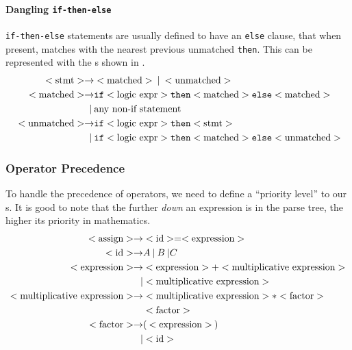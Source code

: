 \paragraph{Dangling \texttt{if-then-else}}\label{par:Dangling_if-else}
\texttt{if-then-else} statements are usually defined to have an \texttt{else} clause, that when present, matches with the nearest previous unmatched \texttt{then}.
This can be represented with the s shown in .
\begin{equation}\label{eq:Dangling_if-else}
  \begin{aligned}
    <\text{stmt}> \rightarrow &<\text{matched}> \: \vert \: <\text{unmatched}> \\
    <\text{matched}> \rightarrow &\mathtt{if} <\text{logic expr}> \mathtt{then} <\text{matched}> \mathtt{else} <\text{matched}> \\
    \vert \: &\text{any non-if statement} \\\
    <\text{unmatched}> \rightarrow &\mathtt{if} <\text{logic expr}> \mathtt{then} <\text{stmt}> \\
    \vert \: &\mathtt{if} <\text{logic expr}> \mathtt{then} <\text{matched}> \mathtt{else} <\text{unmatched}>
  \end{aligned}
\end{equation}

\subsubsection{Operator Precedence}\label{subsubsec:Operator_Precedence}
To handle the precedence of operators, we need to define a ``priority level'' to our s.
It is good to note that the further \emph{down} an expression is in the parse tree, the higher its priority in mathematics.
\begin{equation}\label{eq:Operator_Precedence}
  \begin{aligned}
    <\text{assign}> \rightarrow &<\text{id}> = <\text{expression}> \\
    <\text{id}> \rightarrow &A \: \vert \: B \: \vert C \\
    <\text{expression}> \rightarrow &<\text{expression}> + <\text{multiplicative expression}> \\
    \vert &<\text{multiplicative expression}> \\
    <\text{multiplicative expression}> \rightarrow &<\text{multiplicative expression}> * <\text{factor}> \\
    &<\text{factor}> \\
    <\text{factor}> \rightarrow &( \: <\text{expression}> \: ) \\
    \vert &<\text{id}> \\
  \end{aligned}
\end{equation}

